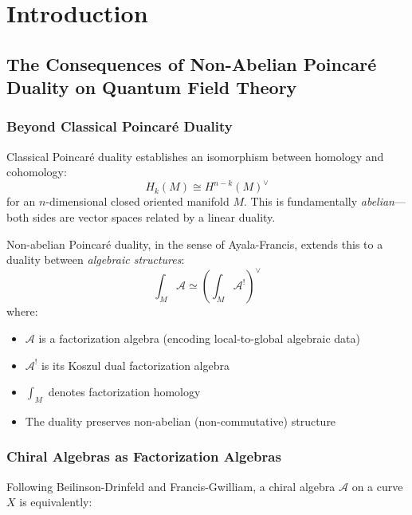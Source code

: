 \chapter{Introduction}

\section{The Consequences of Non-Abelian Poincaré Duality on Quantum Field Theory}
\label{sec:nonabelian-poincare-intro}

\subsection{Beyond Classical Poincaré Duality}

Classical Poincaré duality establishes an isomorphism between homology and cohomology:
\begin{equation}
H_k(M) \cong H^{n-k}(M)^\vee
\end{equation}
for an $n$-dimensional closed oriented manifold $M$. This is fundamentally \emph{abelian}—both sides are vector spaces related by a linear duality.

\begin{principle}
\label{prin:nonabelian-poincare}
Non-abelian Poincaré duality, in the sense of Ayala-Francis, extends this to a duality between \emph{algebraic structures}:
\begin{equation}
\int_M \mathcal{A} \simeq \left(\int_M \mathcal{A}^!\right)^\vee
\end{equation}
where:
\begin{itemize}
\item $\mathcal{A}$ is a factorization algebra (encoding local-to-global algebraic data)
\item $\mathcal{A}^!$ is its Koszul dual factorization algebra
\item $\int_M$ denotes factorization homology
\item The duality preserves non-abelian (non-commutative) structure
\end{itemize}
\end{principle}

\subsection{Chiral Algebras as Factorization Algebras}

Following Beilinson-Drinfeld and Francis-Gwilliam, a chiral algebra $\mathcal{A}$ on a curve $X$ is equivalently:

